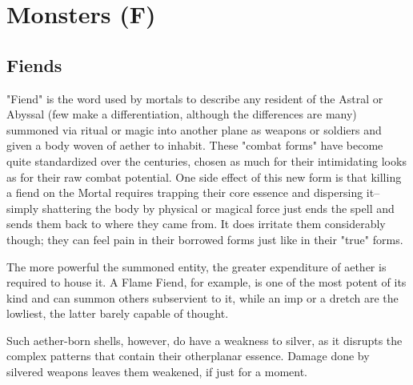 \section{Monsters (F)}\label{sec:monster-f}
\subsection{Fiends}
"Fiend" is the word used by mortals to describe any resident of the Astral or Abyssal (few make a differentiation, although the differences are many) summoned via ritual or magic into another plane as weapons or soldiers and given a body woven of aether to inhabit. These "combat forms" have become quite standardized over the centuries, chosen as much for their intimidating looks as for their raw combat potential. One side effect of this new form is that killing a fiend on the Mortal requires trapping their core essence and dispersing it--simply shattering the body by physical or magical force just ends the spell and sends them back to where they came from. It does irritate them considerably though; they can feel pain in their borrowed forms just like in their "true" forms.

The more powerful the summoned entity, the greater expenditure of aether is required to house it. A Flame Fiend, for example, is one of the most potent of its kind and can summon others subservient to it, while an imp or a dretch are the lowliest, the latter barely capable of thought.

Such aether-born shells, however, do have a weakness to silver, as it disrupts the complex patterns that contain their otherplanar essence. Damage done by silvered weapons leaves them weakened, if just for a moment.

